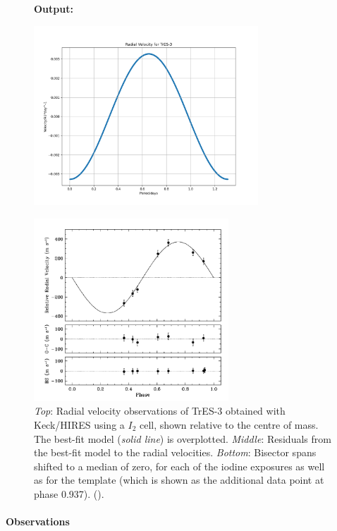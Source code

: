 \documentclass[11pt]{article}
\newcommand*{\figuretitle}[1]{
    	{\textbf{#1}
    	\par\vspace{-1em}}
    }
\begin{document}
\begin{figure}[!hbt]
	\figuretitle{Output:}
	\centering
	\includegraphics[width=0.75\textwidth]{../matplotlib_graphs/radial_velocity_2.png}
\end{figure} 

    
\begin{figure}[H]
	\centering
	\includegraphics[width=0.65\textwidth]{../images/TrE-S_radial_velocity.png}
	\caption{{\it Top}: Radial velocity observations of TrES-3 obtained with Keck/HIRES using a $I_{2}$ cell, shown relative to the centre of mass. The best-fit model ({\it solid line}) is overplotted. {\it Middle}: Residuals from the best-fit model to the radial velocities. {\it Bottom}: Bisector spans shifted to a median of zero, for each of the iodine exposures as well as for the template (which is shown as the additional data point at phase 0.937). (\cite{O_Donovan}).} \label{Figure 4.d}
\end{figure}    


    \hypertarget{observations}{%
\paragraph{Observations}\label{observations_4}}
\end{document}
